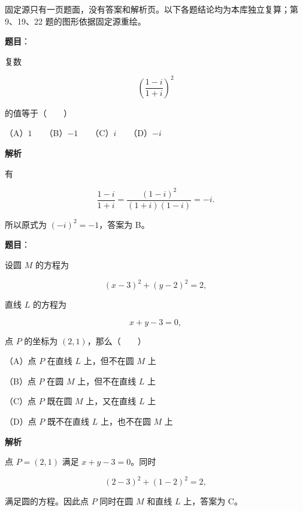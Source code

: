 

\begin{gktip}
固定源只有一页题面，没有答案和解析页。以下各题结论均为本库独立复算；第 9、19、22 题的图形依据固定源重绘。
\end{gktip}

\begin{answer}

\textbf{题目}：

复数

\nopagebreak[4]
\[
\left(\frac{1-i}{1+i}\right)^2
\]

的值等于\mbox{（　　）}

（A）$1$　　（B）$-1$　　（C）$i$　　（D）$-i$

\textbf{解析}

有

\nopagebreak[4]
\[
\frac{1-i}{1+i}
=\frac{(1-i)^2}{(1+i)(1-i)}
=-i.
\]

所以原式为 $(-i)^2=-1$，答案为 B。


\end{answer}
\begin{answer}

\textbf{题目}：

设圆 $M$ 的方程为

\nopagebreak[4]
\[
(x-3)^2+(y-2)^2=2,
\]

直线 $L$ 的方程为

\nopagebreak[4]
\[
x+y-3=0,
\]

点 $P$ 的坐标为 $(2,1)$，那么\mbox{（　　）}

（A）点 $P$ 在直线 $L$ 上，但不在圆 $M$ 上

（B）点 $P$ 在圆 $M$ 上，但不在直线 $L$ 上

（C）点 $P$ 既在圆 $M$ 上，又在直线 $L$ 上

（D）点 $P$ 既不在直线 $L$ 上，也不在圆 $M$ 上

\textbf{解析}

点 $P=(2,1)$ 满足 $x+y-3=0$。同时

\nopagebreak[4]
\[
(2-3)^2+(1-2)^2=2,
\]

满足圆的方程。因此点 $P$ 同时在圆 $M$ 和直线 $L$ 上，答案为 C。


\end{answer}

